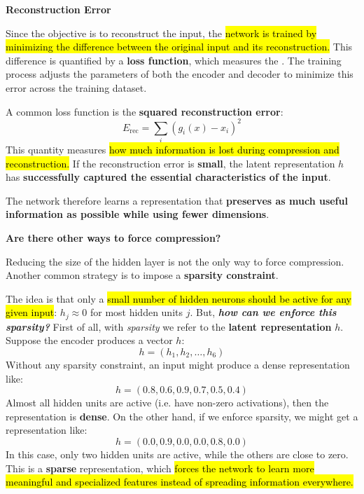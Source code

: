 \highspace
\begin{flushleft}
    \textcolor{Red2}{ \textbf{Reconstruction Error}}
\end{flushleft}
Since the objective is to reconstruct the input, the \hl{network is trained by minimizing the difference between the original input and its reconstruction.} This difference is quantified by a \textbf{loss function}, which measures the . The training process adjusts the parameters of both the encoder and decoder to minimize this error across the training dataset.

\highspace
A common loss function is the \textbf{squared reconstruction error}:
\begin{equation}
    E_{\text{rec}} = \sum_{i} \left(g_{i}(x) - x_i\right)^{2}
\end{equation}
This quantity measures \hl{how much information is lost during compression and reconstruction.} If the reconstruction error is \textbf{small}, the latent representation $h$ has \textbf{successfully captured the essential characteristics of the input}.

\highspace
The network therefore learns a representation that \textbf{preserves as much useful information as possible while using fewer dimensions}.

\newpage

\begin{flushleft}
    \textcolor{Green3}{ \textbf{Are there other ways to force compression?}}\label{def:dense-vector-representation}
\end{flushleft}
Reducing the size of the hidden layer is not the only way to force compression. Another common strategy is to impose a \textbf{sparsity constraint}.

\highspace
The idea is that only a \hl{small number of hidden neurons should be active for any given input}: $h_j \approx 0$ for most hidden units $j$. But, \emph{\textbf{how can we enforce this sparsity?}} First of all, with \emph{sparsity} we refer to the \textbf{latent representation} $h$. Suppose the encoder produces a vector $h$:
\begin{equation*}
    h = \left(h_1, h_2, \ldots, h_6\right)
\end{equation*}
Without any sparsity constraint, an input might produce a dense representation like:
\begin{equation*}
    h = \left(0.8, 0.6, 0.9, 0.7, 0.5, 0.4\right)
\end{equation*}
Almost all hidden units are active (i.e. have non-zero activations), then the representation is \textbf{dense}. On the other hand, if we enforce sparsity, we might get a representation like:
\begin{equation*}
    h = \left(0.0, 0.9, 0.0, 0.0, 0.8, 0.0\right)
\end{equation*}
In this case, only two hidden units are active, while the others are close to zero. This is a \textbf{sparse} representation, which \hl{forces the network to learn more meaningful and specialized features instead of spreading information everywhere.}

